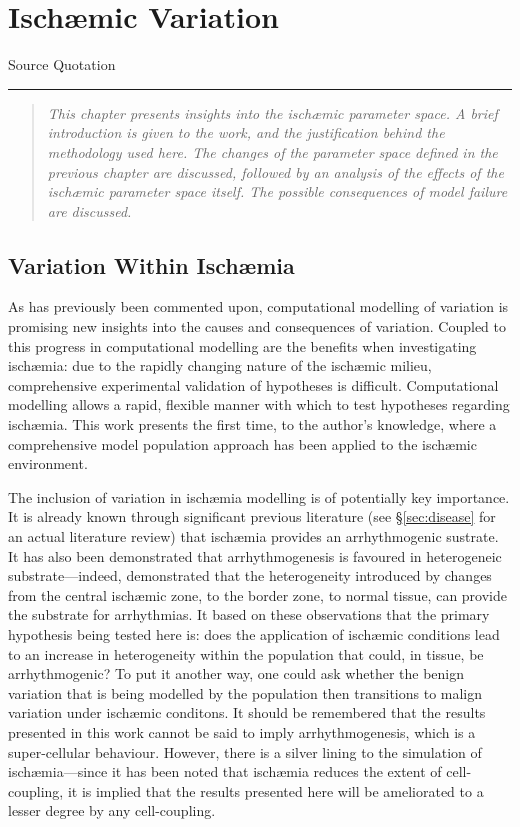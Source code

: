 \documentclass[../thesis-main.tex]{subfiles}
\begin{document}
\chapter{Isch\ae{}mic Variation}
\label{ch:ischaemia}

\begin{aquote}{Source}
  {\selectfont
   Quotation
  }
\end{aquote}
\rule{\linewidth}{0.25mm}

\begin{quote}
 \emph{This chapter presents insights into the isch\ae{}mic parameter space. A brief introduction is given to the work, and the justification behind the methodology used here. The changes of the parameter space defined in the previous chapter are discussed, followed by an analysis of the effects of the isch\ae{}mic parameter space itself. The possible consequences of model failure are discussed.}
\end{quote}

\section{Variation Within Isch\ae{}mia}
\label{sec:ischaemia-rationale}
As has previously been commented upon, computational modelling of variation is promising new insights into the causes and consequences of variation. Coupled to this progress in computational modelling are the benefits when investigating isch\ae{}mia: due to the rapidly changing nature of the isch\ae{}mic milieu, comprehensive experimental validation of hypotheses is difficult. Computational modelling allows a rapid, flexible manner with which to test hypotheses regarding isch\ae{}mia. This work presents the first time, to the author's knowledge, where a comprehensive model population approach has been applied to the isch\ae{}mic environment.

The inclusion of variation in isch\ae{}mia modelling is of potentially key importance. It is already known through significant previous literature (see \S\ref{sec:disease} for an actual literature review) that isch\ae{}mia provides an arrhythmogenic sustrate. It has also been demonstrated that arrhythmogenesis is favoured in heterogeneic substrate---indeed, \citet{Tice2007} demonstrated that the heterogeneity introduced by changes from the central isch\ae{}mic zone, to the border zone, to normal tissue, can provide the substrate for arrhythmias. It based on these observations that the primary hypothesis being tested here is: does the application of isch\ae{}mic conditions lead to an increase in heterogeneity within the population that could, in tissue, be arrhythmogenic? To put it another way, one could ask whether the benign variation that is being modelled by the population then transitions to malign variation under isch\ae{}mic conditons. It should be remembered that the results presented in this work cannot be said to imply arrhythmogenesis, which is a super-cellular behaviour. However, there is a silver lining to the simulation of isch\ae{}mia---since it has been noted that isch\ae{}mia reduces the extent of cell-coupling, it is implied that the results presented here will be ameliorated to a lesser degree by any cell-coupling.
\end{document}
